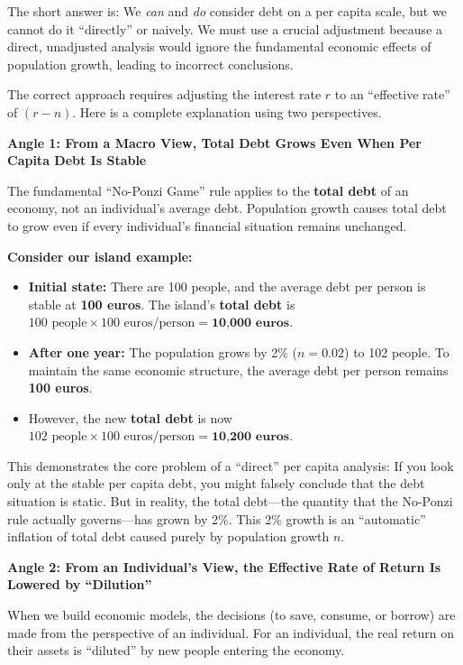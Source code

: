 \begin{remark*}[$e^{-\bar{r}_t t} A_t =  e^{-(\bar{r}_t - n)t} a_t\geq 0$ or $e^{-\bar{r}_tt}a_t \geq 0$? \textbf{Why we cannot consider debt in per capita scale directly?}]
    The short answer is: We \emph{can} and \emph{do} consider debt on a per capita scale, but we cannot do it ``directly'' or naively. We must use a crucial adjustment because a direct, unadjusted analysis would ignore the fundamental economic effects of population growth, leading to incorrect conclusions.

    The correct approach requires adjusting the interest rate $r$ to an ``effective rate'' of $(r-n)$. Here is a complete explanation using two perspectives.

    \textbf{Angle 1: From a Macro View, Total Debt Grows Even When Per Capita Debt Is Stable}

    The fundamental ``No-Ponzi Game'' rule applies to the \textbf{total debt} of an economy, not an individual's average debt. Population growth causes total debt to grow even if every individual's financial situation remains unchanged.

    \textbf{Consider our island example:}
    \begin{itemize}
        \item \textbf{Initial state:} There are 100 people, and the average debt per person is stable at \textbf{100 euros}. The island's \textbf{total debt} is $100 \text{ people} \times 100 \text{ euros/person} = \textbf{10,000 euros}$.
        \item \textbf{After one year:} The population grows by 2\% ($n=0.02$) to 102 people. To maintain the same economic structure, the average debt per person remains \textbf{100 euros}.
        \item However, the new \textbf{total debt} is now $102 \text{ people} \times 100 \text{ euros/person} = \textbf{10,200 euros}$.
    \end{itemize}
    This demonstrates the core problem of a ``direct'' per capita analysis: If you look only at the stable per capita debt, you might falsely conclude that the debt situation is static. But in reality, the total debt---the quantity that the No-Ponzi rule actually governs---has grown by 2\%. This 2\% growth is an ``automatic'' inflation of total debt caused purely by population growth $n$.

    \textbf{Angle 2: From an Individual's View, the Effective Rate of Return Is Lowered by ``Dilution''}

    When we build economic models, the decisions (to save, consume, or borrow) are made from the perspective of an individual. For an individual, the real return on their assets is ``diluted'' by new people entering the economy.


\end{remark*}
